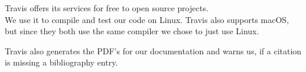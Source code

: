 Travis offers its services for free to open source projects. \cite{travispricing} \\
We use it to compile and test our code on Linux. Travis also supports macOS, but since they both use the same compiler we chose to just use Linux.

Travis also generates the PDF's for our documentation and warns us, if a citation is missing a bibliography entry.
